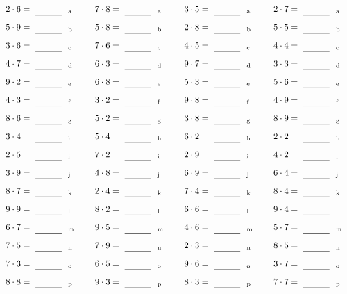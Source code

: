 \documentclass
[
  draft    = true,
  fontsize = 11pt,
  parskip  = half-
]
{scrartcl}
\begin{document}
\par\vfill\par
\begin{align*}
    \pline{2\cdot6}&=\rline{a}
  & \pline{7\cdot8}&=\rline{a}
  & \pline{3\cdot5}&=\rline{a}
  & \pline{2\cdot7}&=\rline{a} \\[1ex]
    \pline{5\cdot9}&=\rline{b}
  & \pline{5\cdot8}&=\rline{b}
  & \pline{2\cdot8}&=\rline{b}
  & \pline{5\cdot5}&=\rline{b} \\[1ex]
    \pline{3\cdot6}&=\rline{c}
  & \pline{7\cdot6}&=\rline{c}
  & \pline{4\cdot5}&=\rline{c}
  & \pline{4\cdot4}&=\rline{c} \\[1ex]
    \pline{4\cdot7}&=\rline{d}
  & \pline{6\cdot3}&=\rline{d}
  & \pline{9\cdot7}&=\rline{d}
  & \pline{3\cdot3}&=\rline{d} \\[1ex]
    \pline{9\cdot2}&=\rline{e}
  & \pline{6\cdot8}&=\rline{e}
  & \pline{5\cdot3}&=\rline{e}
  & \pline{5\cdot6}&=\rline{e} \\[1ex]
    \pline{4\cdot3}&=\rline{f}
  & \pline{3\cdot2}&=\rline{f}
  & \pline{9\cdot8}&=\rline{f}
  & \pline{4\cdot9}&=\rline{f} \\[1ex]
    \pline{8\cdot6}&=\rline{g}
  & \pline{5\cdot2}&=\rline{g}
  & \pline{3\cdot8}&=\rline{g}
  & \pline{8\cdot9}&=\rline{g} \\[1ex]
    \pline{3\cdot4}&=\rline{h}
  & \pline{5\cdot4}&=\rline{h}
  & \pline{6\cdot2}&=\rline{h}
  & \pline{2\cdot2}&=\rline{h} \\[1ex]
    \pline{2\cdot5}&=\rline{i}
  & \pline{7\cdot2}&=\rline{i}
  & \pline{2\cdot9}&=\rline{i}
  & \pline{4\cdot2}&=\rline{i} \\[1ex]
    \pline{3\cdot9}&=\rline{j}
  & \pline{4\cdot8}&=\rline{j}
  & \pline{6\cdot9}&=\rline{j}
  & \pline{6\cdot4}&=\rline{j} \\[1ex]
    \pline{8\cdot7}&=\rline{k}
  & \pline{2\cdot4}&=\rline{k}
  & \pline{7\cdot4}&=\rline{k}
  & \pline{8\cdot4}&=\rline{k} \\[1ex]
    \pline{9\cdot9}&=\rline{l}
  & \pline{8\cdot2}&=\rline{l}
  & \pline{6\cdot6}&=\rline{l}
  & \pline{9\cdot4}&=\rline{l} \\[1ex]
    \pline{6\cdot7}&=\rline{m}
  & \pline{9\cdot5}&=\rline{m}
  & \pline{4\cdot6}&=\rline{m}
  & \pline{5\cdot7}&=\rline{m} \\[1ex]
    \pline{7\cdot5}&=\rline{n}
  & \pline{7\cdot9}&=\rline{n}
  & \pline{2\cdot3}&=\rline{n}
  & \pline{8\cdot5}&=\rline{n} \\[1ex]
    \pline{7\cdot3}&=\rline{o}
  & \pline{6\cdot5}&=\rline{o}
  & \pline{9\cdot6}&=\rline{o}
  & \pline{3\cdot7}&=\rline{o} \\[1ex]
    \pline{8\cdot8}&=\rline{p}
  & \pline{9\cdot3}&=\rline{p}
  & \pline{8\cdot3}&=\rline{p}
  & \pline{7\cdot7}&=\rline{p}
\end{align*}
\end{document}
